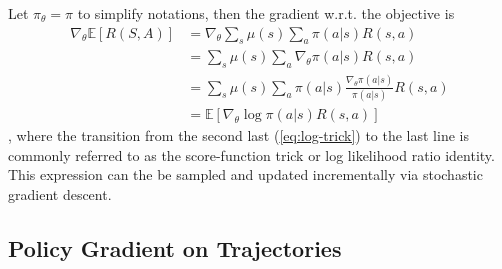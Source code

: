 \documentclass[12pt]{report}
\begin{document}
Let $\pi_\theta = \pi$ to simplify notations, then the gradient w.r.t. the objective is
\begin{align}
\nabla_\theta \mathbb{E}[R(S,A)] &= \nabla_\theta \sum_s \mu(s) \sum_a \pi(a|s) R(s,a) \nonumber\\
&= \sum_s \mu(s) \sum_a \nabla_\theta \pi(a|s) R(s,a) \nonumber\\
&= \sum_s \mu(s) \sum_a \pi(a|s) \frac{\nabla_\theta \pi(a|s)}{\pi(a|s)} R(s,a) \label{eq:log-trick}\\
&= \mathbb{E}[\nabla_\theta \log \pi(a|s) R(s,a)] \nonumber
\end{align}
, where the transition from the second last (\ref{eq:log-trick}) to the last line is commonly referred to as the score-function trick or log likelihood ratio identity. This expression can the be sampled and updated incrementally via stochastic gradient descent.

\subsection{Policy Gradient on Trajectories}
\end{document}
